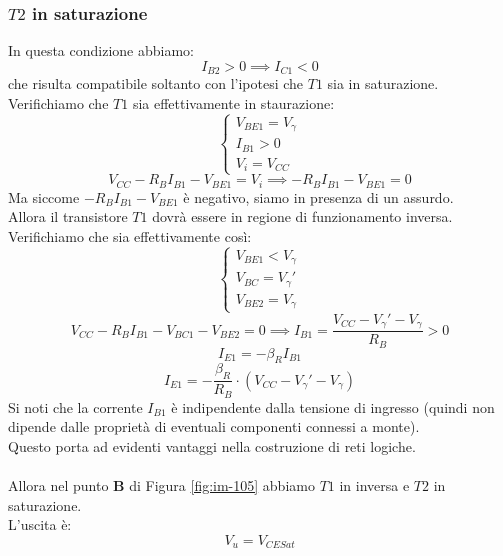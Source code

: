 \documentclass[../main.tex]{subfiles}
\begin{document}
	\subsubsection{$T2$ in saturazione}
	In questa condizione abbiamo:
	\[ I_{B2} > 0 \implies I_{C1} < 0 \]
	che risulta compatibile soltanto con l'ipotesi che $T1$ sia in saturazione.\\
	Verifichiamo che $T1$ sia effettivamente in staurazione:
	\[ \begin{cases} V_{BE1} = V_\gamma \\ I_{B1} > 0 \\ V_i = V_{CC} \end{cases} \]
	\[ V_{CC} - R_B I_{B1} - V_{BE1} = V_i \implies -R_B I_{B1} - V_{BE1} = 0 \]
	Ma siccome $-R_B I_{B1} - V_{BE1}$ è negativo, siamo in presenza di un assurdo.\\
	Allora il transistore $T1$ dovrà essere in regione di funzionamento inversa.\\
	Verifichiamo che sia effettivamente così:
	\[ \begin{cases} V_{BE1} < V_\gamma \\ V_{BC} = V_\gamma' \\ V_{BE2} = V_\gamma \end{cases} \]
	\[ V_{CC} - R_B I_{B1} - V_{BC1} - V_{BE2} = 0 \implies I_{B1} = \frac{V_{CC} - V_\gamma' - V_\gamma}{R_B} > 0 \]
	\[ I_{E1} = -\beta_R I_{B1} \]
	\[ I_{E1} = -\frac{\beta_R}{R_B} \cdot \left( V_{CC} - V_\gamma' - V_\gamma \right) \]
	Si noti che la corrente $I_{B1}$ è indipendente dalla tensione di ingresso (quindi non dipende dalle proprietà di eventuali componenti connessi a monte).\\
	Questo porta ad evidenti vantaggi nella costruzione di reti logiche.\\\\
	Allora nel punto \textbf{B} di Figura \ref{fig:im-105} abbiamo $T1$ in inversa e $T2$ in saturazione.\\
	L'uscita è:
	\[ V_u = V_{CESat} \]
\end{document}
